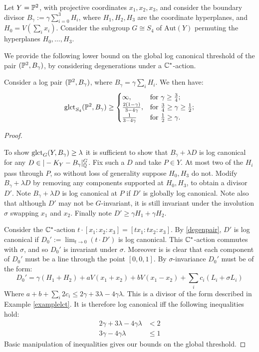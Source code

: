 Let \(Y = \mathbb{P}^2\), with projective coordinates \(x_1,x_2,x_3\), and consider the boundary divisor \(B_\gamma  := \gamma \sum_{i=0}^3  H_i\), where \(H_1,H_2,H_3\) are the coordinate hyperplanes, and \(H_0 = V (\sum_i x_i) \). Consider the subgroup \(G \cong S_4\) of \(\text{Aut}(Y)\) permuting the hyperplanes \(H_0,\dots,H_3\).

We provide the following lower bound on the global log canonical threshold of the pair \((\mathbb{P}^2,B_\gamma)\), by considering degenerations under a \(\mathbb{C}^*\)-action. 
\begin{lemma}\label{lem:alph}
Consider a log pair \((\mathbb{P}^2,B_\gamma)\), where \(B_\gamma = \gamma \sum_i H_i\). We then have:
\[
\operatorname{glct}_{S_4}(\mathbb{P}^2, B_\gamma) \ge
\begin{cases}
\infty, & \text{for } \gamma \ge \frac{3}{4};\\
\frac{2(1-\gamma)}{3-4\gamma}, & \text{for } \frac{3}{4} \ge \gamma \ge \frac{1}{2};\\
\frac{1}{3-4 \gamma} & \text{for } \frac{1}{2} \ge \gamma.
\end{cases}
\]
\end{lemma}
\begin{proof} \

To show \(\operatorname{glct}_{G}(Y,B_\gamma) \ge \lambda\) it is sufficient to show that \(B_\gamma+\lambda D\) is log canonical for any \( D \in |-K_Y - B_\gamma|_{\mathbb{Q}}^G\). Fix such a \(D\) and take \(P \in Y\). At most two of the \(H_i\) pass through \(P\), so without loss of generality suppose \(H_0,H_3\) do not. Modify \(B_\gamma+\lambda D\) by removing any components supported at \(H_0,H_3\), to obtain a divisor \(D'\). Note \(B_\gamma+\lambda D\) is log canonical at \(P\) if \(D'\) is globally log canonical. Note also that although \(D'\) may not be \(G\)-invariant, it is still invariant under the involution \(\sigma \) swapping \(x_1\) and \(x_2\). Finally note \(D' \ge \gamma H_1 + \gamma H_2\).

Consider the \(\mathbb{C}^*\)-action \(t \cdot [x_1:x_2:x_3] = [ t x_1: t x_2 : x_3]\). By \ref{degenpair}, \(D'\) is log canonical if \(D_0' := \lim_{t \to 0} \left( t \cdot D' \right) \) is log canonical. This \(\mathbb{C}^*\)-action commutes with \(\sigma \), and so \(D_0'\) is invariant under \(\sigma\). Moreover is is clear that each component of \(D_0'\) must be a line through the point \([0,0,1]\). By \(\sigma\)-invariance \(D_0'\) must be of the form:
\[
D_0' = \gamma (H_1+H_2) + a V (x_1+x_2) + b V(x_1-x_2) + \sum_i c_i (L_i + \sigma L_i)
\]
Where \(a + b + \sum_i 2 c_i \le 2 \gamma + 3\lambda - 4 \gamma \lambda\). This is a divisor of the form described in Example \ref{examplelct}. It is therefore log canonical iff the following inequalities hold:
\begin{align*}
2\gamma + 3 \lambda - 4\gamma \lambda &< 2 \\
3\gamma - 4\gamma \lambda &\le 1
\end{align*}
Basic manipulation of inequalities gives our bounds on the global threshold.
\end{proof}